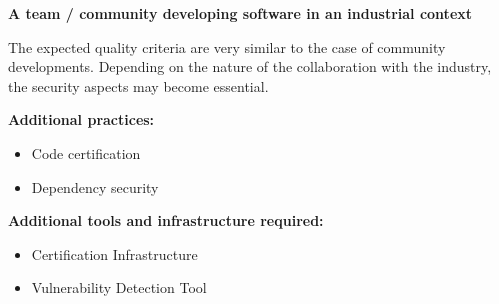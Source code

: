 \textbf{A team / community developing software in an industrial context}

The expected quality criteria are very similar to the case of
community developments. Depending on the nature of the collaboration
with the industry, the security aspects may become essential. 

{\bf Additional practices:}
\begin{itemize}
\item Code certification
\item Dependency security
\end{itemize}

{\bf Additional tools and infrastructure required:}
\begin{itemize}
\item Certification Infrastructure
\item Vulnerability Detection Tool
\end{itemize}


